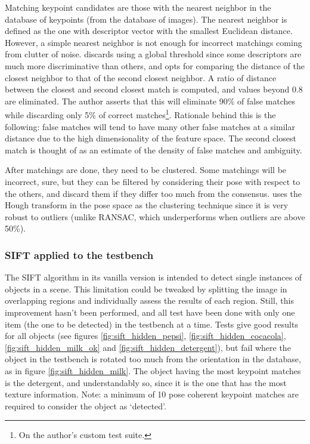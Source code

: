 \documentclass[../main.tex]{subfiles}
\begin{document}
Matching keypoint candidates are those with the nearest neighbor in the database of keypoints (from the database of images). The nearest neighbor is defined as the one with descriptor vector with the smallest Euclidean distance. However, a simple nearest neighbor is not enough for incorrect matchings coming from clutter of noise. \cite{SIFTlowe2004} discards using a global threshold since some descriptors are much more discriminative than others, and opts for comparing the distance of the closest neighbor to that of the second closest neighbor. A ratio of distance between the closest and second closest match is computed, and values beyond 0.8 are eliminated. The author asserts that this will eliminate 90\% of false matches while discarding only 5\% of correct matches\footnote{On the author's custom test suite.}. Rationale behind this is the following: false matches will tend to have many other false matches at a similar distance due to the high dimensionality of the feature space. The second closest match is thought of as an estimate of the density of false matches and ambiguity. 

After matchings are done, they need to be clustered. Some matchings will be incorrect, sure, but they can be filtered by considering their pose with respect to the others, and discard them if they differ too much from the consensus. \cite{SIFTlowe2004} uses the Hough transform in the pose space as the clustering technique since it is very robust to outliers (unlike RANSAC, which underperforms when outliers are above 50\%).

\subsubsection{SIFT applied to the testbench}
The SIFT algorithm in its vanilla version is intended to detect single instances of objects in a scene. This limitation could be tweaked by splitting the image in overlapping regions and individually assess the results of each region. Still, this improvement hasn't been performed, and all test have been done with only one item (the one to be detected) in the testbench at a time. Tests give good results for all objects (see figures \ref{fig:sift_hidden_pepsi}, \ref{fig:sift_hidden_cocacola}, \ref{fig:sift_hidden_milk_ok} and \ref{fig:sift_hidden_detergent}), but fail where the object in the testbench is rotated too much from the orientation in the database, as in figure \ref{fig:sift_hidden_milk}. The object having the most keypoint matches is the detergent, and understandably so, since it is the one that has the most texture information. Note: a minimum of 10 pose coherent keypoint matches are required to consider the object as `detected'.
\end{document}

